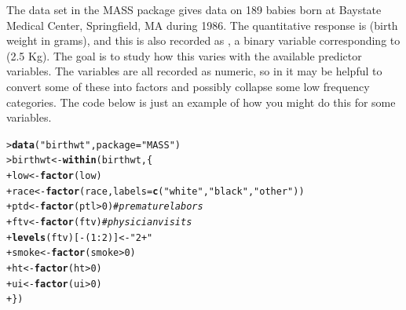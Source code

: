 \documentclass[10pt]{report}\usepackage[]{graphicx}\usepackage[]{color}
\makeatletter
\newcommand{\hlnum}[1]{\textcolor[rgb]{0.686,0.059,0.569}{#1}}%
\newcommand{\hlstr}[1]{\textcolor[rgb]{0.192,0.494,0.8}{#1}}%
\newcommand{\hlcom}[1]{\textcolor[rgb]{0.678,0.584,0.686}{\textit{#1}}}%
\newcommand{\hlopt}[1]{\textcolor[rgb]{0,0,0}{#1}}%
\newcommand{\hlstd}[1]{\textcolor[rgb]{0.345,0.345,0.345}{#1}}%
\newcommand{\hlkwb}[1]{\textcolor[rgb]{0.69,0.353,0.396}{#1}}%
\newcommand{\hlkwc}[1]{\textcolor[rgb]{0.333,0.667,0.333}{#1}}%
\newcommand{\hlkwd}[1]{\textcolor[rgb]{0.737,0.353,0.396}{\textbf{#1}}}%
\newenvironment{kframe}{%
 \def\at@end@of@kframe{}%
 \ifinner\ifhmode%
  \def\at@end@of@kframe{\end{minipage}}%
  \begin{minipage}{\columnwidth}%
 \fi\fi%
 \def\FrameCommand##1{\hskip\@totalleftmargin \hskip-\fboxsep
 \colorbox{shadecolor}{##1}\hskip-\fboxsep
     \hskip-\linewidth \hskip-\@totalleftmargin \hskip\columnwidth}%
 \MakeFramed {\advance\hsize-\width
   \@totalleftmargin\z@ \linewidth\hsize
   \@setminipage}}%
 {\par\unskip\endMakeFramed%
 \at@end@of@kframe}
\newenvironment{knitrout}{}{} %
\renewenvironment{knitrout}{\small\renewcommand{\baselinestretch}{.85}}{} %
\makeatother
\begin{document}
\begin{Exercises}
\exercise The data set  in the MASS package gives data on 189 babies born at Baystate Medical Center, Springfield, MA during 1986. The quantitative response is  (birth weight in grams), and this is also recorded as , a binary variable corresponding to 
 (2.5 Kg).  The goal is to study how this varies with the available predictor variables.  
The variables are all recorded as numeric, so in \R it may be helpful to convert some of these into factors and possibly collapse some low frequency categories.  The code below is just an example of how you might do this for some variables.
\begin{knitrout}\footnotesize
{}\color{fgcolor}\begin{kframe}
\begin{alltt}
\hlstd{> }\hlkwd{data}\hlstd{(}\hlstr{"birthwt"}\hlstd{,} \hlkwc{package}\hlstd{=}\hlstr{"MASS"}\hlstd{)}
\hlstd{> }\hlstd{birthwt} \hlkwb{<-} \hlkwd{within}\hlstd{(birthwt, \{}
\hlstd{+ }  \hlstd{low} \hlkwb{<-} \hlkwd{factor}\hlstd{(low)}
\hlstd{+ }  \hlstd{race} \hlkwb{<-} \hlkwd{factor}\hlstd{(race,} \hlkwc{labels} \hlstd{=} \hlkwd{c}\hlstd{(}\hlstr{"white"}\hlstd{,} \hlstr{"black"}\hlstd{,} \hlstr{"other"}\hlstd{))}
\hlstd{+ }  \hlstd{ptd} \hlkwb{<-} \hlkwd{factor}\hlstd{(ptl} \hlopt{>} \hlnum{0}\hlstd{)}  \hlcom{# premature labors}
\hlstd{+ }  \hlstd{ftv} \hlkwb{<-} \hlkwd{factor}\hlstd{(ftv)}      \hlcom{# physician visits}
\hlstd{+ }  \hlkwd{levels}\hlstd{(ftv)[}\hlopt{-}\hlstd{(}\hlnum{1}\hlopt{:}\hlnum{2}\hlstd{)]} \hlkwb{<-} \hlstr{"2+"}
\hlstd{+ }  \hlstd{smoke} \hlkwb{<-} \hlkwd{factor}\hlstd{(smoke}\hlopt{>}\hlnum{0}\hlstd{)}
\hlstd{+ }  \hlstd{ht} \hlkwb{<-} \hlkwd{factor}\hlstd{(ht}\hlopt{>}\hlnum{0}\hlstd{)}
\hlstd{+ }  \hlstd{ui} \hlkwb{<-} \hlkwd{factor}\hlstd{(ui}\hlopt{>}\hlnum{0}\hlstd{)}
\hlstd{+ }  \hlstd{\})}
\end{alltt}
\end{kframe}
\end{knitrout}

  \begin{enumerate*}
  

\end{enumerate*}
\end{Exercises}
\end{document}
